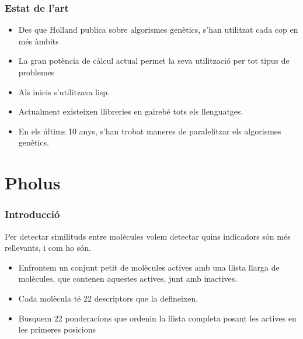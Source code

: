 \documentclass{beamer}
\begin{document}
\begin{frame}
\frametitle{Estat de l'art}
\begin{itemize}
\item Des que Holland publica sobre algorismes genètics, s'han utilitzat cada
cop en més àmbits
\item La gran potència de càlcul actual permet la seva utilització per tot tipus
de problemes
\pause
\item Als inicis s'utilitzava lisp.
\item Actualment existeixen llibreries en gairebé tots els llenguatges.
\item En els últims 10 anys, s'han trobat maneres de paralelitzar els algorismes
genètics.
\end{itemize}
\end{frame}


\section{Pholus} %
\label{sec:Pholus}

\begin{frame}
	\frametitle{Introducció}
	Per detectar similituds entre molècules volem detectar quins indicadors són més rellevants, i
	com ho són. 
	\pause
	\begin{itemize}
		\item Enfrontem un conjunt petit de molècules actives amb una llista llarga de molècules,
			que contenen aquestes actives, junt amb inactives.
		\item Cada molècula té 22 descriptors que la defineixen.
		\item Busquem 22 ponderacions que ordenin la llista completa posant les actives en les
			primeres posicions
	\end{itemize}
\end{frame}
\end{document}
